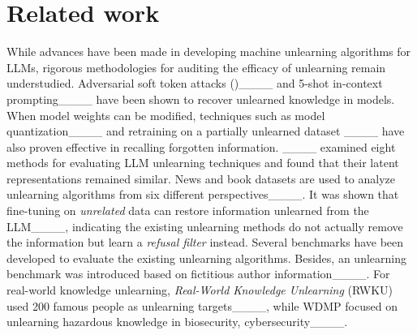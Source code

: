 \section{Related work}
While advances have been made in developing machine unlearning algorithms for LLMs, rigorous methodologies for auditing the efficacy of unlearning remain understudied.
Adversarial soft token attacks ()____ and 5-shot in-context prompting____ have been shown to recover unlearned knowledge in models. 
When model weights can be modified, techniques such as model quantization____ and retraining on a partially unlearned dataset ____ have also proven effective in recalling forgotten information. 
____ examined eight methods for evaluating LLM unlearning techniques and found that their latent representations remained similar.
News and book datasets are used to analyze unlearning algorithms from six different perspectives____.
It was shown that fine-tuning on \emph{unrelated} data can restore information unlearned from the LLM____, indicating the existing unlearning methods do not actually remove the information but learn a \emph{refusal filter} instead.
Several benchmarks have been developed to evaluate the existing unlearning algorithms.
Besides, an unlearning benchmark was introduced based on fictitious author information____.
For real-world knowledge unlearning, \emph{Real-World Knowledge Unlearning} (RWKU) used 200 famous people as unlearning targets____, while WDMP focused on unlearning hazardous knowledge in biosecurity, cybersecurity____.